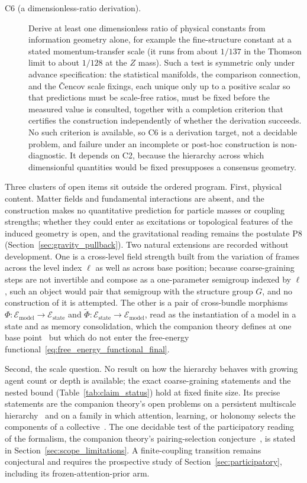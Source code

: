 \begin{description}
\item[C6 (a dimensionless-ratio derivation).] Derive at least one dimensionless ratio of physical constants from information geometry alone, for example the fine-structure constant at a stated momentum-transfer scale (it runs from about $1/137$ in the Thomson limit to about $1/128$ at the $Z$ mass). Such a test is symmetric only under advance specification: the statistical manifolds, the comparison connection, and the \v{C}encov scale fixings, each unique only up to a positive scalar so that predictions must be scale-free ratios, must be fixed before the measured value is consulted, together with a completion criterion that certifies the construction independently of whether the derivation succeeds. No such criterion is available, so C6 is a derivation target, not a decidable problem, and failure under an incomplete or post-hoc construction is non-diagnostic. It depends on C2, because the hierarchy across which dimensionful quantities would be fixed presupposes a consensus geometry.
\end{description}

Three clusters of open items sit outside the ordered program. First, physical content. Matter fields and fundamental interactions are absent, and the construction makes no quantitative prediction for particle masses or coupling strengths; whether they could enter as excitations or topological features of the induced geometry is open, and the gravitational reading remains the postulate P8 (Section~\ref{sec:gravity_pullback}). Two natural extensions are recorded without development. One is a cross-level field strength built from the variation of frames across the level index $\ell$ as well as across base position; because coarse-graining steps are not invertible and compose as a one-parameter semigroup indexed by $\ell$, such an object would pair that semigroup with the structure group $G$, and no construction of it is attempted. The other is a pair of cross-bundle morphisms $\Phi: \mathcal{E}_{\mathrm{model}} \to \mathcal{E}_{\mathrm{state}}$ and $\tilde{\Phi}: \mathcal{E}_{\mathrm{state}} \to \mathcal{E}_{\mathrm{model}}$, read as the instantiation of a model in a state and as memory consolidation, which the companion theory defines at one base point~\cite[Ch.~2]{DennisGaugeVFE2026} but which do not enter the free-energy functional~\eqref{eq:free_energy_functional_final}.

Second, the scale question. No result on how the hierarchy behaves with growing agent count or depth is available; the exact coarse-graining statements and the nested bound (Table~\ref{tab:claim_status}) hold at fixed finite size. Its precise statements are the companion theory's open problems on a persistent multiscale hierarchy~\cite[Ch.~12]{DennisGaugeVFE2026} and on a family in which attention, learning, or holonomy selects the components of a collective~\cite[Ch.~13]{DennisGaugeVFE2026}. The one decidable test of the participatory reading of the formalism, the companion theory's pairing-selection conjecture~\cite[Ch.~14]{DennisGaugeVFE2026}, is stated in Section~\ref{sec:scope_limitations}. A finite-coupling transition remains conjectural and requires the prospective study of Section~\ref{sec:participatory}, including its frozen-attention-prior arm.

